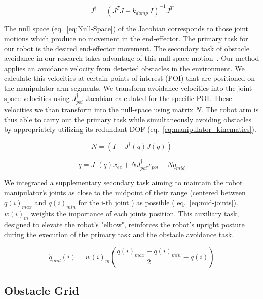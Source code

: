 \documentclass[a4paper]{article}
\begin{document}
\begin{equation}   	
	J^{\dagger} = (J^{T}J + k_{damp} ~I)^{-1}J^{T}
	\label{eq:moore_penrose}
\end{equation}

The null space (eq.~\ref{eq:Null-Space}) of the Jacobian corresponds to those joint motions which produce no movement in the end-effector. The primary task for our robot is the desired end-effector movement. The secondary task of obstacle avoidance in our research takes advantage of this null-space motion~\cite{lajpah_Petri_2012}. Our method applies an avoidance velocity from detected obstacles in the environment. We calculate this velocities at certain points of interest (POI) that are positioned on the manipulator arm segments. We transform avoidance velocities into the joint space velocities using $J^{\dagger}_{poi}$ Jacobian calculated for the specific POI. These velocities we than transform into the null-space using matrix $N$. The robot arm is thus able to carry out the primary task while simultaneously avoiding obstacles by appropriately utilizing its redundant DOF (eq.~\ref{eq:manipulator_kinematics}). 

\begin{equation}
	N = (I - J^{\dagger}(q)J(q))
	\label{eq:Null-Space}
\end{equation}

\begin{equation}
	\dot{q} = J^{\dagger}(q) \dot{x}_{ee} + N J^{\dagger}_{poi} \dot{x}_{poi} + N \dot{q}_{mid}
	\label{eq:manipulator_kinematics}
\end{equation}


We integrated a supplementary secondary task aiming to maintain the robot manipulator's joints as close to the midpoint of their range (centered between $q(i)_{max}$ and $q(i)_{min}$ for the i-th joint ) as possible ( eq.~\ref{eq:mid-joints}). $w(i)_m$ weights the importance of each joints position. This auxiliary task, designed to elevate the robot's "elbow", reinforces the robot's upright posture during the execution of the primary task and the obstacle avoidance task.

\begin{equation}
	\dot{q}_{mid}(i) = w(i)_m \left( \frac{q(i)_{max}-q(i)_{min}}{2} - q(i)\right) 
	\label{eq:mid-joints}
\end{equation}

\subsection{Obstacle Grid}
\end{document}
